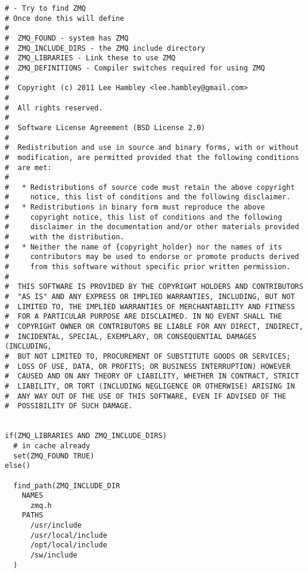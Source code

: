   \normalsize

 \footnotesize
\begin{tcolorbox}[sharp corners, colframe=gray!80, colback=LightGray, left=0pt, top=0pt, bottom=0pt, title=\texttt{br2\_bt\_bumpgo/cmake/FindZMQ.cmake}]
  \begin{verbatim}
# - Try to find ZMQ
# Once done this will define
#
#  ZMQ_FOUND - system has ZMQ
#  ZMQ_INCLUDE_DIRS - the ZMQ include directory
#  ZMQ_LIBRARIES - Link these to use ZMQ
#  ZMQ_DEFINITIONS - Compiler switches required for using ZMQ
#
#  Copyright (c) 2011 Lee Hambley <lee.hambley@gmail.com>
#
#  All rights reserved.
#
#  Software License Agreement (BSD License 2.0)
#
#  Redistribution and use in source and binary forms, with or without
#  modification, are permitted provided that the following conditions
#  are met:
#
#   * Redistributions of source code must retain the above copyright
#     notice, this list of conditions and the following disclaimer.
#   * Redistributions in binary form must reproduce the above
#     copyright notice, this list of conditions and the following
#     disclaimer in the documentation and/or other materials provided
#     with the distribution.
#   * Neither the name of {copyright_holder} nor the names of its
#     contributors may be used to endorse or promote products derived
#     from this software without specific prior written permission.
#
#  THIS SOFTWARE IS PROVIDED BY THE COPYRIGHT HOLDERS AND CONTRIBUTORS
#  "AS IS" AND ANY EXPRESS OR IMPLIED WARRANTIES, INCLUDING, BUT NOT
#  LIMITED TO, THE IMPLIED WARRANTIES OF MERCHANTABILITY AND FITNESS
#  FOR A PARTICULAR PURPOSE ARE DISCLAIMED. IN NO EVENT SHALL THE
#  COPYRIGHT OWNER OR CONTRIBUTORS BE LIABLE FOR ANY DIRECT, INDIRECT,
#  INCIDENTAL, SPECIAL, EXEMPLARY, OR CONSEQUENTIAL DAMAGES (INCLUDING,
#  BUT NOT LIMITED TO, PROCUREMENT OF SUBSTITUTE GOODS OR SERVICES;
#  LOSS OF USE, DATA, OR PROFITS; OR BUSINESS INTERRUPTION) HOWEVER
#  CAUSED AND ON ANY THEORY OF LIABILITY, WHETHER IN CONTRACT, STRICT
#  LIABILITY, OR TORT (INCLUDING NEGLIGENCE OR OTHERWISE) ARISING IN
#  ANY WAY OUT OF THE USE OF THIS SOFTWARE, EVEN IF ADVISED OF THE
#  POSSIBILITY OF SUCH DAMAGE.


if(ZMQ_LIBRARIES AND ZMQ_INCLUDE_DIRS)
  # in cache already
  set(ZMQ_FOUND TRUE)
else()

  find_path(ZMQ_INCLUDE_DIR
    NAMES
      zmq.h
    PATHS
      /usr/include
      /usr/local/include
      /opt/local/include
      /sw/include
  )


\end{verbatim}
\end{tcolorbox}
